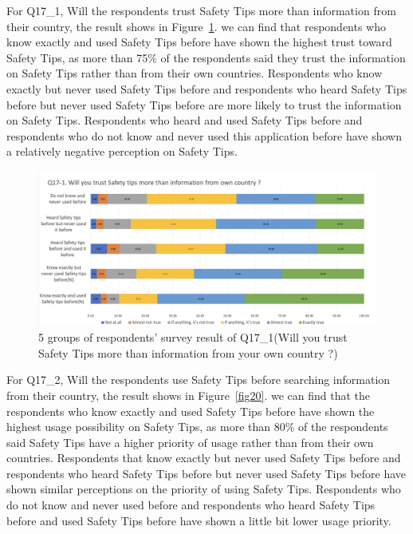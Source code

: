 For Q17\_1, Will the respondents trust Safety Tips more than information from their country, the result shows in Figure~\ref{fig19}. we can find that respondents who know exactly and used Safety Tips before have shown the highest trust toward Safety Tips, as more than 75\% of the respondents said they trust the information on Safety Tips rather than from their own countries. Respondents who know exactly but never used Safety Tips before and respondents who heard Safety Tips before but never used Safety Tips before are more likely to trust the information on Safety Tips. Respondents who heard and used Safety Tips before and respondents who do not know and never used this application before have shown a relatively negative perception on Safety Tips. 

\begin{figure}[h]
  \includegraphics[width=0.8\linewidth]{Figure/Figure19.jpg}
  \centering
  \caption[5 groups of respondents' survey result of Q17\_1]{5 groups of respondents' survey result of Q17\_1(Will you trust Safety Tips more than information from your own country ?)}
  \label{fig19}
\end{figure}

For Q17\_2, Will the respondents use Safety Tips before searching information from their country, the result shows in Figure~\ref{fig20}. we can find that the respondents who know exactly and used Safety Tips before have shown the highest usage possibility on Safety Tips, as more than 80\% of the respondents said Safety Tips have a higher priority of usage rather than from their own countries. Respondents that know exactly but never used Safety Tips before and respondents who heard Safety Tips before but never used Safety Tips before have shown similar perceptions on the priority of using Safety Tips. Respondents who do not know and never used before and respondents who heard Safety Tips before and used Safety Tips before have shown a little bit lower usage priority. 

